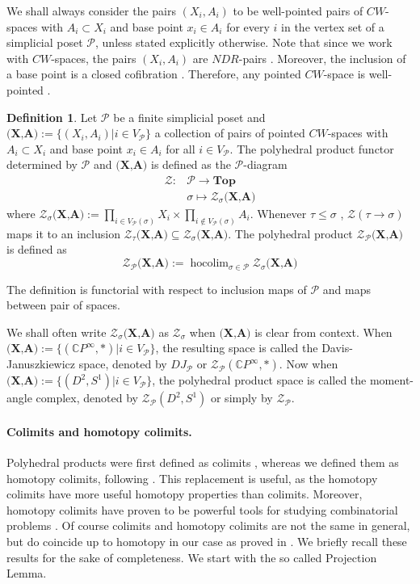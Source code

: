\documentclass[a4paper,11pt]{article}
\theoremstyle{definition}
\newtheorem{definition}[theorem]{Definition}
\DeclareMathOperator*{\hocolim}{hocolim}
\newcommand{\Top}{\textbf{Top}}
\newcommand{\C}{\mathbb{C}}
\newcommand{\PP}{\mathcal{P}}
\newcommand{\ZZ}{\mathcal{Z}}
\begin{document}
We shall always consider the pairs $(X_i,A_i)$ to be well-pointed pairs of $CW$-spaces with $A_i \subset X_i$ and base point $x_i \in A_i$ for every $i$ in the vertex set of a simplicial poset $\PP$, unless stated explicitly otherwise. Note that since we work with $CW$-spaces, the pairs $(X_i,A_i)$ are $NDR$-pairs \cite[Proposition~A4]{Hatcher}. Moreover, the inclusion of a base point is a closed cofibration \cite[Corollary~1.3.7]{fritsch_piccinini_1990}.
Therefore, any pointed $CW$-space is well-pointed \cite[Definiton~1.1.5]{cubical-homotopy}.  

\begin{definition}\label{def-poly-space}
	Let $\PP$ be a finite simplicial poset and $\textbf{(X,A)} := \{(X_i,A_i) | i \in V_\PP\}$ a collection of pairs of pointed $CW$-spaces with $A_i \subset X_i$ and base point $x_i \in A_i$ for all $i \in V_\PP$.  The polyhedral product functor determined by $\PP$ and $\textbf{(X,A)}$ is defined as the $\PP$-diagram
		\begin{align*}
			\ZZ: & \PP \to \Top \\
			& \sigma \mapsto \ZZ_\sigma\textbf{(X,A)}
		\end{align*}
		where $\ZZ_\sigma\textbf{(X,A)} := \prod_{i \in V_\PP(\sigma)}X_i \times \prod_{i \not\in V_\PP(\sigma)}A_i$. Whenever $\tau \leq \sigma$ , $\ZZ(\tau \to \sigma)$ maps it to an inclusion $\ZZ_\tau\textbf{(X,A)} \subseteq \ZZ_\sigma\textbf{(X,A)}$.		
		The polyhedral product $\ZZ_{\PP}\textbf{(X,A)}$ is defined as 
		\[
		\ZZ_{\PP}\textbf{(X,A)} := \hocolim_{\sigma \in \PP} \ZZ_\sigma\textbf{(X,A)} 
		\]
	
	The definition is functorial with respect to inclusion maps of $\PP$ and maps between pair of spaces.
\end{definition}

We shall often write $\ZZ_\sigma\textbf{(X,A)}$ as $\ZZ_\sigma$ when $\textbf{(X,A)}$ is clear from context. When $\textbf{(X,A)} := \{(\C P^\infty,*) | i \in V_\PP\}$, the resulting space is called the Davis-Januszkiewicz space, denoted by $DJ_\PP$ or $\ZZ_\PP(\C P^\infty,*)$. Now when $\textbf{(X,A)} := \{(D^2,S^1) | i \in V_\PP\}$, the polyhedral product space is called the moment-angle complex, denoted by $\ZZ_\PP(D^2,S^1)$ or simply by $\ZZ_\PP$.


\paragraph{Colimits and homotopy colimits.} Polyhedral products were first defined as colimits \cite{BBCG,lue-panov}, whereas we defined them as homotopy colimits, following \cite{kishimoto2019polyhedral}. This replacement is useful, as the homotopy colimits have more useful homotopy properties than colimits. Moreover, homotopy colimits have proven to be powerful tools for studying combinatorial problems \cite{homo-type-diagram,hocolim-comb,poset-fiber-thm}. Of course colimits and homotopy colimits are not the same in general, but do coincide up to homotopy in our case as proved in \cite{kishimoto2019polyhedral}. We briefly recall these results for the sake of completeness. We start with the so called Projection Lemma. 
\end{document}
